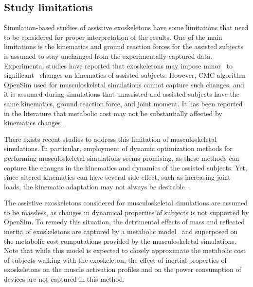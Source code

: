 \documentclass[10pt,letterpaper]{article}
\begin{document}
\subsection*{Study limitations}

Simulation-based studies of assistive exoskeletons have some limitations that need to be considered for proper interpretation of the results. One of the main limitations is the kinematics and ground reaction forces for the assisted subjects is assumed to stay unchanged from the experimentally captured data. Experimental studies have reported that exoskeletons may impose minor~\cite{Collins2015,Panizzolo2016} to significant~\cite{Quinlivan2017,Koller2015} changes on kinematics of assisted subjects. However, CMC algorithm OpenSim used for musculoskeletal simulations cannot capture such changes, and it is assumed  during simulations that unassisted and assisted subjects have the same kinematics, ground reaction force, and joint moment. It has been reported in the literature that metabolic cost may not  be substantially affected by kinematics changes~\cite{Vanderpool2008}.

There exists recent studies to address this limitation of musculoskeletal simulations. In particular, employment of dynamic optimization methods for performing musculoskeletal simulations seems promising, as these methods can capture the changes in the kinematics and dynamics of the assisted subjects. Yet, since altered kinematics can have several side effect, such as increasing joint loads, the kinematic adaptation may not always be desirable~\cite{Dembia2017}.

The assistive exoskeletons considered for musculoskeletal simulations are assumed to be massless, as changes in dynamical properties of subjects is not supported by OpenSim. To remedy this situation, the detrimental effects of mass and reflected inertia of exoskeletons are captured by a metabolic model~\cite{Browning2007} and superposed on the metabolic cost computations provided by the musculoskeletal simulations. Note that while this model is expected to closely approximate the metabolic cost of subjects walking with the exoskeleton, the effect of inertial properties of exoskeletons on the muscle activation profiles and on the power consumption of devices are not captured in this method.
\end{document}
